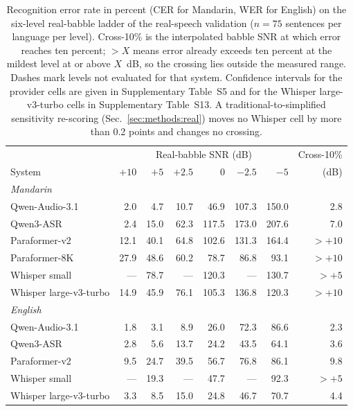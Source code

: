 \begin{table}[t]
\centering
\caption{Recognition error rate in percent (CER for Mandarin, WER for
English) on the six-level real-babble ladder of the real-speech validation
($n = 75$ sentences per language per level). Cross-10\% is the interpolated
babble SNR at which error reaches ten percent; $>X$ means error already
exceeds ten percent at the mildest level at or above $X$~dB, so the crossing
lies outside the measured range. Dashes mark levels not evaluated for that
system. Confidence intervals for the provider cells are given in Supplementary
Table~S5 and for the Whisper large-v3-turbo cells in Supplementary
Table~S13. A traditional-to-simplified sensitivity re-scoring
(Sec.~\ref{sec:methods:real}) moves no Whisper cell by more than 0.2 points
and changes no crossing.}
\label{tab:babble}
\footnotesize
\setlength{\tabcolsep}{4pt}
\begin{tabular}{lrrrrrrr}
\toprule
 & \multicolumn{6}{c}{Real-babble SNR (dB)} & Cross-10\% \\
System & $+10$ & $+5$ & $+2.5$ & $0$ & $-2.5$ & $-5$ & (dB) \\
\midrule
\multicolumn{8}{l}{\emph{Mandarin}} \\
Qwen-Audio-3.1 & 2.0 & 4.7 & 10.7 & 46.9 & 107.3 & 150.0 & 2.8 \\
Qwen3-ASR & 2.4 & 15.0 & 62.3 & 117.5 & 173.0 & 207.6 & 7.0 \\
Paraformer-v2 & 12.1 & 40.1 & 64.8 & 102.6 & 131.3 & 164.4 & $>+10$ \\
Paraformer-8K & 27.9 & 48.6 & 60.2 & 78.7 & 86.8 & 93.1 & $>+10$ \\
Whisper small & --- & 78.7 & --- & 120.3 & --- & 130.7 & $>+5$ \\
Whisper large-v3-turbo & 14.9 & 45.9 & 76.1 & 105.3 & 136.8 & 120.3 & $>+10$ \\
\midrule
\multicolumn{8}{l}{\emph{English}} \\
Qwen-Audio-3.1 & 1.8 & 3.1 & 8.9 & 26.0 & 72.3 & 86.6 & 2.3 \\
Qwen3-ASR & 2.8 & 5.6 & 13.7 & 24.2 & 43.5 & 64.1 & 3.6 \\
Paraformer-v2 & 9.5 & 24.7 & 39.5 & 56.7 & 76.8 & 86.1 & 9.8 \\
Whisper small & --- & 19.3 & --- & 47.7 & --- & 92.3 & $>+5$ \\
Whisper large-v3-turbo & 3.3 & 8.5 & 15.0 & 24.8 & 46.7 & 70.7 & 4.4 \\
\bottomrule
\end{tabular}
\end{table}
